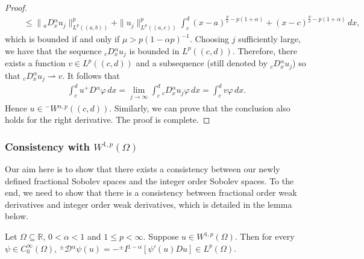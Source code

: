 \documentclass[leqno,final]{siamltex}
\numberwithin{equation}{section}
\renewcommand{\(}{\bigl(}
\renewcommand{\)}{\bigr)}
\newcommand{\R}{\mathbb{R}}
\begin{document}
\begin{proof}
\begin{align*}
            &\quad\leq  \| {_{a}}{D}{^{\alpha}_{x}} u_j\|_{L^{p}((a,b))}^{p}+  \|u_j\|_{L^{\mu}((a,c))}^{p} \int_{c}^{d} (x-a)^{\frac{p}{\nu} - p (1+\alpha)} + (x-c)^{\frac{p}{\nu} -p(1+\alpha)}\,dx,
        \end{align*}
        which is bounded if and only if $\mu > p(1-\alpha p)^{-1}$. Choosing $j$ sufficiently large, we have that the sequence ${_{c}}{D}{^{\alpha}_{x}} u_j $ is bounded in $L^{p}((c,d))$. Therefore, there exists a function $v \in L^p((c,d))$ and a subsequence (still denoted by ${_{c}}{D}{^{\alpha}_{x}} u_j$) so that ${_{c}}{D}{^{\alpha}_{x}} u_j \rightharpoonup v$. It follows that 
        \begin{align*}
           \int_{c}^{d} u {^{+}}{D}{^{\alpha}}\varphi\, dx =  \lim_{j \rightarrow \infty} \int_{c}^{d} {_{c}}{D}{^{\alpha}_{x}} u_j \varphi \,d x= \int_{c}^{d} v \varphi\, dx.
        \end{align*}
        Hence $u \in {^{-}}{W}{^{\alpha,p}}((c,d))$. Similarly, we can prove
        that the conclusion also holds for the right derivative.   The proof is complete.
    \end{proof}
    
    \subsubsection{\bf Consistency with $W^{1,p}(\Omega)$}\label{sec-4.6.1}
         Our aim here is to show that there exists a consistency between our newly defined fractional Sobolev spaces 
         and the integer order Sobolev spaces. To the end,  we need to show that there is a consistency between 
         fractional order weak derivatives and integer order weak derivatives, which is detailed in the   
         lemma below. 
        
        \begin{lemma}\label{lem_consistency}
            Let $\Omega \subseteq \R$, $0 <\alpha<1$ and $1 \leq p < \infty$. Suppose $u \in W^{1,p}(\Omega)$. Then for every $\psi \in C^{\infty}_{0}(\Omega)$, ${^{\pm}}{\mathcal{D}}{^{\alpha}} \psi(u)= -{^{\pm}}{I}{^{1- \alpha}} [ \psi'(u) Du] \in L^{p}(\Omega)$. 
        \end{lemma}
    
\end{document}
